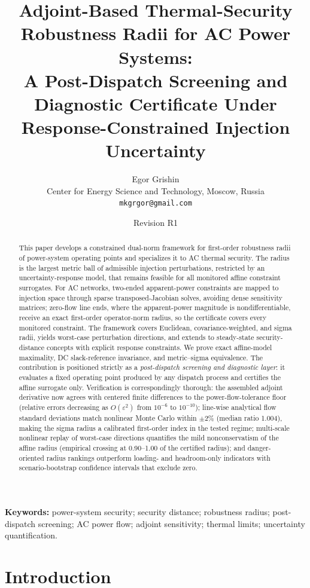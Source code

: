 \documentclass[11pt]{article}
\title{Adjoint-Based Thermal-Security Robustness Radii for AC Power Systems:\\
A Post-Dispatch Screening and Diagnostic Certificate Under
Response-Constrained Injection Uncertainty}
\author{Egor Grishin\\
Center for Energy Science and Technology, Moscow, Russia\\
\texttt{mkgrgor@gmail.com}}
\date{Revision R1}
\begin{document}
\maketitle

\begin{abstract}
This paper develops a constrained dual-norm framework for first-order
robustness radii of power-system operating points and specializes it to AC
thermal security.  The radius is the largest metric ball of admissible
injection perturbations, restricted by an uncertainty-response model, that
remains feasible for all monitored affine constraint surrogates.  For AC
networks, two-ended apparent-power constraints are mapped to injection space
through sparse transposed-Jacobian solves, avoiding dense sensitivity
matrices; zero-flow line ends, where the apparent-power magnitude is
nondifferentiable, receive an exact first-order operator-norm radius, so the
certificate covers every monitored constraint.  The framework covers
Euclidean, covariance-weighted, and sigma radii, yields worst-case
perturbation directions, and extends to steady-state security-distance
concepts with explicit response constraints.  We prove exact affine-model
maximality, DC slack-reference invariance, and metric--sigma equivalence.
The contribution is positioned strictly as a \emph{post-dispatch screening
and diagnostic layer}: it evaluates a fixed operating point produced by any
dispatch process and certifies the affine surrogate only.  Verification is
correspondingly thorough: the assembled adjoint derivative now agrees with
centered finite differences to the power-flow-tolerance floor (relative
errors decreasing as $O(\varepsilon^2)$ from $10^{-6}$ to $10^{-10}$);
line-wise analytical flow standard deviations match nonlinear Monte Carlo
within $\pm 2\%$ (median ratio 1.004), making the sigma radius a calibrated
first-order index in the tested regime; multi-scale nonlinear replay of
worst-case directions quantifies the mild nonconservatism of the affine
radius (empirical crossing at 0.90--1.00 of the certified radius); and
danger-oriented radius rankings outperform loading- and headroom-only
indicators with scenario-bootstrap confidence intervals that exclude zero.
\end{abstract}

\noindent\textbf{Keywords:} power-system security; security distance;
robustness radius; post-dispatch screening; AC power flow; adjoint
sensitivity; thermal limits; uncertainty quantification.

\section{Introduction}
\label{sec:intro}
\end{document}
